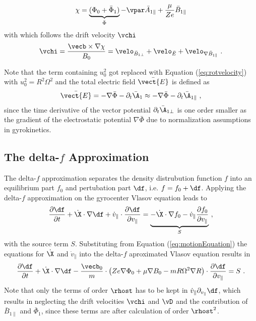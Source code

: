 \begin{gather}
	\chi = \underbrace{(\Phi_0 + \bar{\Phi}_1)}_{\bar{\Phi}} - \vpar \bar{A}_{1\parallel} + \frac{\mu}{Ze} \bar{B}_{1\parallel}
	\label{eq:driftPotential}
\end{gather}
with which follows the drift velocity $\vchi$ 
\begin{gather}
	\vchi = \frac{\vecb \times \nabla \chi}{B_0} = \velo_{\bar{B}_{1\perp}} + \velo_{\bar{E}} + \velo_{\nabla \bar{B}_{1\parallel}}~.
	\label{eq:veloDriftPotential}
\end{gather}
\bigskip

Note that the term containing $u_0^2$ got replaced with Equation (\ref{eq:rotvelocity}) with $u_0^2 = R^2 \Omega^2$ and the total electric field $\bar{\vect{E}}$ is defined as 
\begin{gather}
	\bar{\vect{E}} = - \nabla \bar{\Phi} - \partial_t \bar{\A}_1 \approx - \nabla \bar{\Phi} - \partial_t \bar{\A}_{1\parallel} ~,
	\label{eq:totalElectricField}
\end{gather}
since the time derivative of the vector potential $\partial_t \bar{\A}_{1\perp}$ is one order smaller as the gradient of the electrostatic potential $\nabla \bar{\Phi}$ due to normalization assumptions in gyrokinetics\source.




\newpage

\subsection{The delta-\!$f$ Approximation}
\label{sub:approximation}

The delta-\!$f$ approximation separates the density distrubution function $f$ into an equilibrium part $f_0$ and pertubation part $\df$, i.e. $f = f_0 + \df$. Applying the delta-\!$f$ approximation on the gyrocenter Vlasov equation leads to
\begin{gather}
	\frac{\partial \df}{\partial t} + \dot{\X} \cdot \nabla \df + \dot{v}_\parallel \cdot \frac{\partial \df}{\partial v_\parallel} = \underbrace{- \dot{\X} \cdot \nabla f_0 - \dot{v}_\parallel \frac{\partial f_0}{\partial v_\parallel}}_S~,
	\label{eq:gyrocenterDeltafVlasov}
\end{gather}
with the source term $S$. Substituting from Equation (\ref{eq:motionEquation}) the equations for $\dot{\X}$ and $\dot{v}_\parallel$ into the delta-$f$ aproximated Vlasov equation results in
\begin{gather}
	\frac{\partial \df}{\partial t} + \dot{\X} \cdot \nabla \df - \frac{\vecb_0}{m} \cdot \left(Ze\nabla \Phi_0 + \mu \nabla B_0 - mR \Omega^2 \nabla R \right) \cdot \frac{\partial \df}{\partial v_\parallel} = S~.
	\label{eq:gyrocenterDeltafSubVlasov}
\end{gather}
Note that only the terms of order $\rhost$ has to be kept in $\dot{v}_\parallel \partial_{v_\parallel} \df$, which results in neglecting the drift velocities $\vchi$ and $\vD$ and the contribution of $\bar{B}_{1\parallel}$ and $\bar{\Phi}_1$, since these terms are after calculation of order $\rhost^2$. \bigskip

